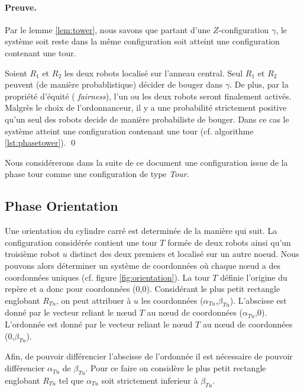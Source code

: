 \documentclass{article}
\begin{document}
      \paragraph{Preuve.} Par le lemme \ref{lem:tower}, nous savons que partant
        d'une $Z$-configuration $\gamma$, le système soit reste dans la même
        configuration soit atteint une configuration contenant une tour.

        Soient $R_1$ et $R_2$ les deux robots localisé sur l'anneau
        central. Seul $R_1$ et $R_2$ peuvent (de manière probablistique) décider
        de bouger dans $\gamma$. De plus, par la propriété d'équité ({\it
          fairness}), l'un ou les deux robots seront finalement activés. Malgrès
        le choix de l'ordonnanceur, il y a une probabilité strictement positive
        qu'un seul des robots decide de manière probabiliste de bouger. Dans ce
        cas le système atteint une configuration contenant une tour
        (cf. algorithme \ref{lst:phasetower}). \qed \medskip

      Nous considérerons dans la suite de ce document une configuration issue de
      la phase tour comme une configuration de type {\it Tour}.

    \subsection{Phase Orientation}
      \label{sec:orientation}

      Une orientation du cylindre carré est determinée de la manière qui
      suit. La configuration considérée contient une tour $T$ formée de deux
      robots ainsi qu'un troisième robot $u$ distinct des deux premiers et
      localisé sur un autre noeud. Nous pouvons alors déterminer un système de
      coordonnées où chaque n\oe{}ud a des coordonnées uniques (cf. figure
      \ref{fig:orientation}). La tour $T$ définie l'origine du repère et a donc
      pour coordonnées (0,0). Considérant le plus petit rectangle englobant
      $R_{Tu}$, on peut attribuer à $u$ les coordonnées
      ($\alpha_{Tu}$,$\beta_{Tu}$). L'abscisse est donné par le vecteur reliant
      le n\oe{}ud $T$ au n\oe{}ud de coordonnées ($\alpha_{Tu}$,0). L'ordonnée
      est donné par le vecteur reliant le n\oe{}ud $T$ au n\oe{}ud de
      coordonnées (0,$\beta_{Tu}$).

      Afin, de pouvoir différencier l'abscisse de l'ordonnée il est nécessaire
      de pouvoir différencier $\alpha_{Tu}$ de $\beta_{Tu}$. Pour ce faire on
      considère le plus petit rectangle englobant $R_{Tu}$ tel que $\alpha_{Tu}$
      soit strictement inferieur à $\beta_{Tu}$. \medskip
\end{document}
